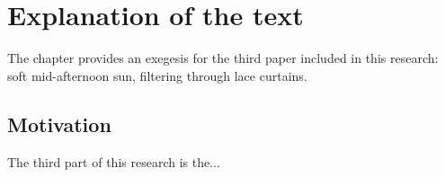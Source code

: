 


\section{Explanation of the text}

The chapter provides an exegesis for the third paper included in this research: soft mid-afternoon sun, filtering through lace curtains. 

\subsection{Motivation}

The third part of this research is the...